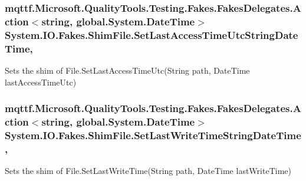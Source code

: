 \hypertarget{class_system_1_1_i_o_1_1_fakes_1_1_shim_file_ae7f4121d1d2753d44412b68d272072d8}{
\subsubsection[{Set\-Last\-Access\-Time\-Utc\-String\-Date\-Time}]{\setlength{\rightskip}{0pt plus 5cm}mqttf.\-Microsoft.\-Quality\-Tools.\-Testing.\-Fakes.\-Fakes\-Delegates.\-Action$<$string, global.\-System.\-Date\-Time$>$ System.\-I\-O.\-Fakes.\-Shim\-File.\-Set\-Last\-Access\-Time\-Utc\-String\-Date\-Time\hspace{0.3cm}{\ttfamily [static]}, {\ttfamily [set]}}}\label{class_system_1_1_i_o_1_1_fakes_1_1_shim_file_ae7f4121d1d2753d44412b68d272072d8}


Sets the shim of File.\-Set\-Last\-Access\-Time\-Utc(\-String path, Date\-Time last\-Access\-Time\-Utc)

\hypertarget{class_system_1_1_i_o_1_1_fakes_1_1_shim_file_a0481b1c018a87249ac879353dc896808}{
\subsubsection[{Set\-Last\-Write\-Time\-String\-Date\-Time}]{\setlength{\rightskip}{0pt plus 5cm}mqttf.\-Microsoft.\-Quality\-Tools.\-Testing.\-Fakes.\-Fakes\-Delegates.\-Action$<$string, global.\-System.\-Date\-Time$>$ System.\-I\-O.\-Fakes.\-Shim\-File.\-Set\-Last\-Write\-Time\-String\-Date\-Time\hspace{0.3cm}{\ttfamily [static]}, {\ttfamily [set]}}}\label{class_system_1_1_i_o_1_1_fakes_1_1_shim_file_a0481b1c018a87249ac879353dc896808}


Sets the shim of File.\-Set\-Last\-Write\-Time(\-String path, Date\-Time last\-Write\-Time)

